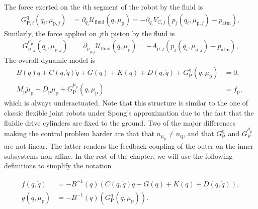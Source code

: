 The force exerted on the $i$th segment of the robot by the fluid is 
%
\begin{equation}\label{eq:backstepping:GPq}
\begin{split}
    G_{\mathrm{P},i}^{\mathrm{q}}(q_i,\mu_{\mathrm{p},j}) &= \partial_{q_i} \mathcal{U}_\mathrm{fluid}(q,\mu_\mathrm{p}) = -\partial_{q_i} V_{C,j} \left ( p_{j}(q_i, \mu_{\mathrm{p},j}) - p_\mathrm{atm} \right ), 
\end{split}
\end{equation}
Similarly, the force applied on $j$th piston by the fluid is
%
\begin{equation}\label{eq:backstepping:GPmu}
\begin{split}
    G_{\mathrm{P},j}^{\mu_\mathrm{p}}(q_i,\mu_{\mathrm{p},j}) &= \partial_{\mu_{\mathrm{p},j}} \mathcal{U}_\mathrm{fluid}(q,\mu_\mathrm{p}) = - A_{\mathrm{p},j} \left ( p_{j}(q_i, \mu_{\mathrm{p},j}) - p_\mathrm{atm} \right ), 
\end{split}
\end{equation}
%
The overall dynamic model is
%
\begin{equation}\label{eq:backstepping:complete_dyn} %
\begin{split}
	B(q)\ddot{q} \!+\! C(q,\dot{q})\dot{q} \!+\! G(q) \!+\! K(q) \!+\! D(q,\dot{q}) \!+\! G_{\mathrm{P}}^{\mathrm{q}}(q,\mu_\mathrm{p}) &= 0, \\
	M_\mathrm{p} \ddot{\mu}_\mathrm{p} + D_\mathrm{p} \dot{\mu}_\mathrm{p} + G_{\mathrm{P}}^{\mu_\mathrm{p}}(q,\mu_\mathrm{p}) &= f_\mathrm{p}, \; 
\end{split}
\end{equation}
which is always underactuated.
%
Note that this structure is similar to the one of classic flexible joint robots under Spong's approximation \cite{della2021flexible} due to the fact that the fluidic drive cylinders are fixed to the ground. Two of the major differences making the control problem harder are that that $n_{\mu_\mathrm{p}} \neq n_{\mathrm{q}}$, and that $G_{\mathrm{P}}^{\mathrm{q}}$ and $G_{\mathrm{P}}^{\mu_\mathrm{p}}$ are not linear.
The latter renders the feedback coupling of the outer on the inner subsystems non-affine.
%
In the rest of the chapter, we will use the following definitions to simplify the notation
%
\begin{small}
\begin{equation}\label{eq:backstepping:gf}
\begin{split}
	f(q,\dot{q}) &= - B^{-1}(q)\left(C(q,\dot{q})\dot{q} + G(q) + K(q) + D(q, \dot{q}) \right), \\
	g(q,\mu_\mathrm{p}) &= - B^{-1}(q) \left ( G_{\mathrm{P}}^{\mathrm{q}}(q,\mu_\mathrm{p}) \right ).
\end{split}
\end{equation}
\end{small}